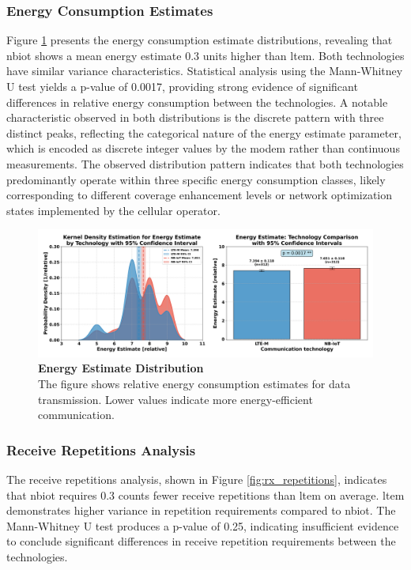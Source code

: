\documentclass[12pt, english, openany]{book}
\begin{document}
\subsubsection*{Energy Consumption Estimates} \label{sec:energy_consumption_analysis}

Figure \ref{fig:energy_estimate} presents the energy consumption estimate distributions, revealing that \gls{nbiot} shows a mean energy estimate 0.3 units higher than \gls{ltem}. Both technologies have similar variance characteristics. Statistical analysis using the Mann-Whitney U test yields a p-value of 0.0017, providing strong evidence of significant differences in relative energy consumption between the technologies. A notable characteristic observed in both distributions is the discrete pattern with three distinct peaks, reflecting the categorical nature of the energy estimate parameter, which is encoded as discrete integer values by the modem rather than continuous measurements. The observed distribution pattern indicates that both technologies predominantly operate within three specific energy consumption classes, likely corresponding to different coverage enhancement levels or network optimization states implemented by the cellular operator.

\begin{figure}[htbp]
    \centering
    \includegraphics[width=1.0\textwidth]{energy_estimate_kde_ci.png}
    \caption{\textbf{Energy Estimate Distribution} \\ The figure shows relative energy consumption estimates for data transmission. Lower values indicate more energy-efficient communication.}
    \label{fig:energy_estimate}
\end{figure}
\FloatBarrier
\subsubsection*{Receive Repetitions Analysis}\label{sec:receive_repetitions_analysis}

The receive repetitions analysis, shown in Figure \ref{fig:rx_repetitions}, indicates that \gls{nbiot} requires 0.3 counts fewer receive repetitions than \gls{ltem} on average. \gls{ltem} demonstrates higher variance in repetition requirements compared to \gls{nbiot}. The Mann-Whitney U test produces a p-value of 0.25, indicating insufficient evidence to conclude significant differences in receive repetition requirements between the technologies.
\end{document}
